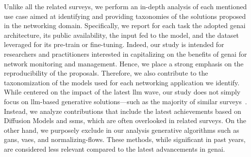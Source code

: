 Unlike all the related surveys, we perform an in-depth analysis of each mentioned use case aimed at identifying and providing taxonomies of the solutions proposed in the networking domain.
Specifically, we report for each task the adopted \gls{genai} architecture, its public availability, the input fed to the model, and the dataset leveraged for its pre-train or fine-tuning. 
Indeed, our study is intended for researchers and practitioners interested in capitalizing on the benefits of \gls{genai} for network monitoring and management.
Hence, we place a strong emphasis on the reproducibility of the proposals.
Therefore, we also contribute to the taxonomization of the models used for each networking application we identify.
While centered on the impact of the latest \gls{llm} wave,
our study does not simply focus on \gls{llm}-based generative solutions---such as the majority of similar surveys~\cite{hassanin2024comprehensive, zhou2024large, huang2023large, huang2024digital, liu2024large, chaccour2024telecom}. %
%
Instead, we analyze contributions that include the latest achievements based on Diffusion Models and \glspl{ssm}, which are often overlooked in related surveys.
On the other hand, we purposely exclude in our analysis generative algorithms such as
\glspl{gan}, \glspl{vae}, and normalizing-flows.
These methods, while significant in past years, are considered less relevant compared to the latest advancements in \gls{genai}.
%














